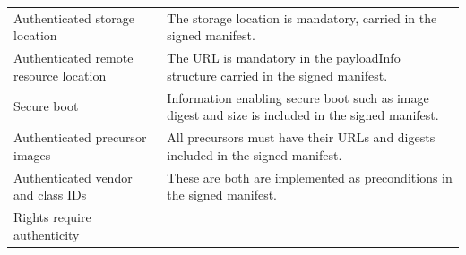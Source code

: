 \documentclass[0-thesis.tex]{subfiles}
\begin{document}
\begin{small}
\begin{longtable}[]{@{}ll@{}}
    \begin{minipage}[t]{0.37\columnwidth}\raggedright\strut
    Authenticated storage location\strut
    \end{minipage} & \begin{minipage}[t]{0.57\columnwidth}\raggedright\strut
    The storage location is mandatory, carried in the signed manifest.\strut
    \end{minipage}\tabularnewline
    \begin{minipage}[t]{0.37\columnwidth}\raggedright\strut
    Authenticated remote resource location\strut
    \end{minipage} & \begin{minipage}[t]{0.57\columnwidth}\raggedright\strut
    The URL is mandatory in the payloadInfo structure carried in the signed
    manifest.\strut
    \end{minipage}\tabularnewline
    \begin{minipage}[t]{0.37\columnwidth}\raggedright\strut
    Secure boot\strut
    \end{minipage} & \begin{minipage}[t]{0.57\columnwidth}\raggedright\strut
    Information enabling secure boot such as image digest and size is
    included in the signed manifest.\strut
    \end{minipage}\tabularnewline
    \begin{minipage}[t]{0.37\columnwidth}\raggedright\strut
    Authenticated precursor images\strut
    \end{minipage} & \begin{minipage}[t]{0.57\columnwidth}\raggedright\strut
    All precursors must have their URLs and digests included in the signed
    manifest.\strut
    \end{minipage}\tabularnewline
    \begin{minipage}[t]{0.37\columnwidth}\raggedright\strut
    Authenticated vendor and class IDs\strut
    \end{minipage} & \begin{minipage}[t]{0.57\columnwidth}\raggedright\strut
    These are both are implemented as preconditions in the signed manifest.\strut
    \end{minipage}\tabularnewline
    \begin{minipage}[t]{0.37\columnwidth}\raggedright\strut
    Rights require authenticity\strut
    \end{minipage} & \begin{minipage}[t]{0.57\columnwidth}\raggedright\strut

\end{minipage}
\end{longtable}
\end{small}
\end{document}
